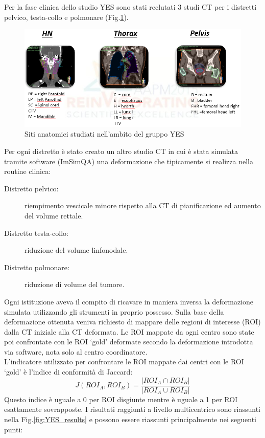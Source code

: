 Per la fase clinica dello studio YES sono stati reclutati 3 studi CT per i distretti pelvico, testa-collo e polmonare (Fig.\ref{fig:YES_sites}).
\begin{figure}
\centering
\includegraphics[width=\textwidth]{./cap3/YES_Sites.png}
\caption{Siti anatomici studiati nell'ambito del gruppo YES}
\label{fig:YES_sites}
\end{figure}
Per ogni distretto è stato creato un altro studio CT in cui è stata simulata tramite software (ImSimQA) una deformazione che tipicamente si realizza nella routine clinica:
\begin{description}
\item[Distretto pelvico:] riempimento vescicale minore rispetto alla CT di pianificazione ed aumento del volume rettale.
\item[Distretto testa-collo:] riduzione del volume linfonodale.
\item[Distretto polmonare:] riduzione di volume del tumore.
\end{description}
Ogni istituzione aveva il compito di ricavare in maniera inversa la deformazione simulata utilizzando gli strumenti in proprio possesso. Sulla base della deformazione ottenuta veniva richiesto di mappare delle regioni di interesse (ROI) dalla CT iniziale alla CT deformata. Le ROI mappate da ogni centro sono state poi confrontate con le ROI `gold' deformate secondo la deformazione introdotta via software, nota solo al centro coordinatore.\\
L'indicatore utilizzato per confrontare le ROI mappate dai centri con le ROI `gold' è l'indice di conformità di Jaccard:
\begin{equation}
J(ROI_{A},ROI_{B}) = \frac{|ROI_{A} \cap ROI_{B}|}{|ROI_{A} \cup ROI_{B}|}
\end{equation}
Questo indice è uguale a 0 per ROI disgiunte mentre è uguale a 1 per ROI esattamente sovrapposte.
I risultati raggiunti a livello multicentrico sono riassunti nella Fig.\ref{fig:YES_results} e possono essere riassunti principalmente nei seguenti punti:
